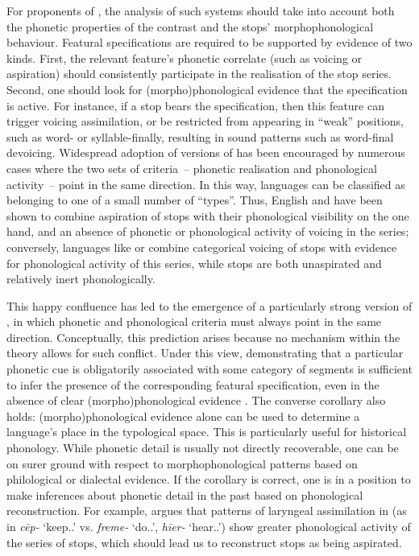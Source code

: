 \documentclass[output=paper,colorlinks,citecolor=brown]{langscibook}
\begin{document}
For proponents of , the analysis of such systems should take into account both the phonetic properties of the contrast and the stops' morphophonological behaviour. Featural specifications are required to be supported by evidence of two kinds. First, the relevant feature's phonetic correlate (such as voicing or aspiration) should consistently participate in the realisation of the stop series. Second, one should look for (morpho)phonological evidence that the specification is active. For instance, if a stop bears the  specification, then this feature can trigger voicing assimilation, or be restricted from appearing in \enquote{weak} positions, such as word- or syllable\hyp finally, resulting in sound patterns such as word\hyp final devoicing. Widespread adoption of versions of  has been encouraged by numerous cases where the two sets of criteria~-- phonetic realisation and phonological activity~-- point in the same direction. In this way, languages can be classified as belonging to one of a small number of \enquote{types}. Thus, English and  have been shown to combine aspiration of  stops with their phonological visibility on the one hand, and an absence of phonetic or phonological activity of voicing in the  series; conversely, languages like   or   combine categorical voicing of  stops with evidence for phonological activity of this series, while  stops are both unaspirated and relatively inert phonologically.

This happy confluence has led to the emergence of a particularly strong version of , in which phonetic and phonological criteria must always point in the same direction. Conceptually, this prediction arises because no mechanism within the theory allows for such conflict. Under this view, demonstrating that a particular phonetic cue is obligatorily associated with some category of segments is sufficient to infer the presence of the corresponding featural specification, even in the absence of clear (morpho)phonological evidence \parencite[e.\,g.][]{beckmanng:_empir}. The converse corollary also holds: (morpho)phonological evidence alone can be used to determine a language's place in the typological space. This is particularly useful for historical phonology. While phonetic detail is usually not directly recoverable, one can be on surer ground with respect to morphophonological patterns based on philological or dialectal evidence. If the corollary is correct, one is in a position to make inferences about phonetic detail in the past based on phonological reconstruction. For example, \textcite{spaargaren09:_chang_englis} argues that patterns of laryngeal assimilation in  (as in \textit{cēp\mbox{-}} `{keep.\Pst.\Tsg}' vs. \textit{freme-} `{do.\Pst.\Tsg}', \textit{hīer-} `{hear.\Pst.\Tsg}') show greater phonological activity of the  series of stops, which should lead us to reconstruct   stops as being aspirated.
\end{document}
